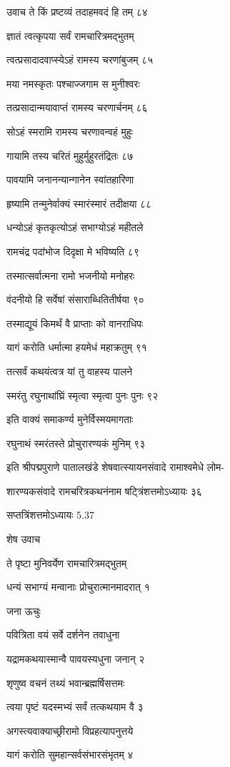 उवाच ते किं प्रष्टव्यं तदाहमवदं हि तम् ८४

ज्ञातं त्वत्कृपया सर्वं रामचारित्रमद्भुतम्

त्वत्प्रसादादवाप्स्येऽहं रामस्य चरणांबुजम् ८५

मया नमस्कृतः पश्चाज्जगाम स मुनीश्वरः

तत्प्रसादान्मयावाप्तं रामस्य चरणार्चनम् ८६

सोऽहं स्मरामि रामस्य चरणावन्वहं मुहुः

गायामि तस्य चरितं मुहुर्मुहुरतंद्रितः ८७

पावयामि जनानन्यान्गानेन स्वांतहारिणा

हृष्यामि तन्मुनेर्वाक्यं स्मारंस्मारं तदीक्षया ८८

धन्योऽहं कृतकृत्योऽहं सभाग्योऽहं महीतले

रामचंद्र पदांभोज दिदृक्षा मे भविष्यति ८९

तस्मात्सर्वात्मना रामो भजनीयो मनोहरः

वंदनीयो हि सर्वेषां संसाराब्धितितीर्षया ९०

तस्माद्यूयं किमर्थं वै प्राप्ताः को वानराधिपः

यागं करोति धर्मात्मा हयमेधं महाक्रतुम् ९१

तत्सर्वं कथयंत्वत्र यां तु वाहस्य पालने

स्मरंतु रघुनाथांघ्रिं स्मृत्वा स्मृत्वा पुनः पुनः ९२

इति वाक्यं समाकर्ण्य मुनेर्विस्मयमागताः

रघुनाथं स्मरंतस्ते प्रोचुरारण्यकं मुनिम् ९३

इति श्रीपद्मपुराणे पातालखंडे शेषवात्स्यायनसंवादे रामाश्वमेधे लोम-

शारण्यकसंवादे रामचरित्रकथनंनाम षट्त्रिंशत्तमोऽध्यायः ३६

सप्तत्रिंशत्तमोऽध्यायः 5.37

शेष उवाच

ते पृष्टा मुनिवर्येण रामचारित्रमद्भुतम्

धन्यं सभाग्यं मन्वानाः प्रोचुरात्मानमादरात् १

जना ऊचुः

पवित्रिता वयं सर्वे दर्शनेन तवाधुना

यद्रामकथयास्मान्वै पावयस्यधुना जनान् २

शृणुष्व वचनं तथ्यं भवान्ब्रह्मर्षिसत्तमः

त्वया पृष्टं यदस्मभ्यं सर्वं तत्कथयाम वै ३

अगस्त्यवाक्याच्छ्रीरामो विप्रहत्यापनुत्तये

यागं करोति सुमहान्सर्वसंभारसंभृतम् ४

